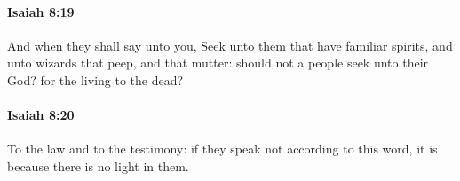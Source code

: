		\paragraph{Isaiah 8:19} %
			\label{ISAIAH-8-19}

			And when they shall say unto you, Seek unto them that have familiar spirits, and unto wizards that peep, and that mutter: should not a people seek unto their God? for the living to the dead?


		\paragraph{Isaiah 8:20} %
			\label{ISAIAH-8-20}

			To the law and to the testimony: if they speak not according to this word, it is because there is no light in them.


